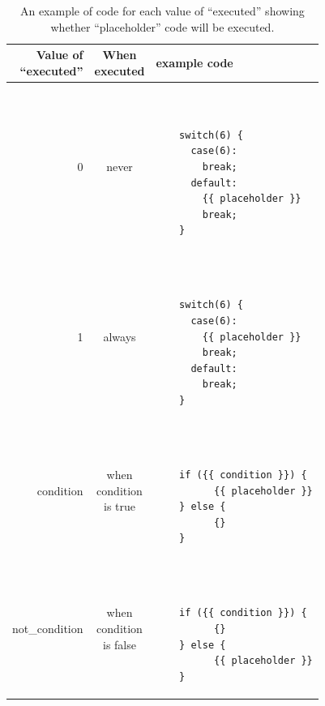 \begin{table}[H]
    \centering
    \caption{An example of code for each value of ``executed'' showing whether
      ``placeholder'' code will be executed.}
    \begin{tabular}{|r|c|l|}
    \hline
      \makecell{Value of \\ ``executed''} &
      \makecell{When \\ executed} &
      example code \\
    \hline
    0 &
    never &
    \begin{minipage}{3in}
    \begin{verbatim}


    switch(6) {
      case(6):
        break;
      default:
        {{ placeholder }}
        break;
    }
    \end{verbatim}
    \end{minipage}
    \\
    \hline
    1 &
    always &
    \begin{minipage}{3in}
    \begin{verbatim}


    switch(6) {
      case(6):
        {{ placeholder }}
        break;
      default:
        break;
    }
    \end{verbatim}
    \end{minipage}
    \\
    \hline
    condition &
    \makecell{when \\ condition \\ is true} &
    \begin{minipage}{3in}
    \begin{verbatim}


    if ({{ condition }}) {
          {{ placeholder }}
    } else {
          {}
    }
    \end{verbatim}
    \end{minipage}
    \\
    \hline
    not\_condition &
    \makecell{when \\ condition \\ is false} &
    \begin{minipage}{3in}
    \begin{verbatim}


    if ({{ condition }}) {
          {}
    } else {
          {{ placeholder }}
    }
    \end{verbatim}
    \end{minipage}
    \\
    \hline
    \end{tabular}
    \label{tab:execution examples}
\end{table}

